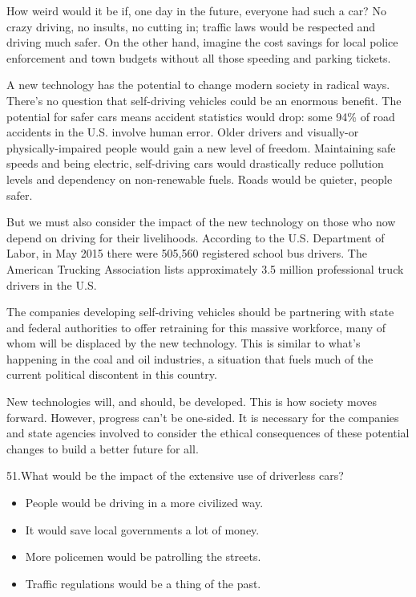 \documentclass[UTF8,11pt]{ctexart}
\begin{document}
How weird would it be if, one day in the future, everyone had such a car? No crazy driving, no insults, no cutting in; traffic laws would be respected and driving much safer. On the other hand, imagine the cost savings for local police enforcement and town budgets without all those speeding and parking tickets.


A new technology has the potential to change modern society in radical ways. There’s no question that self-driving vehicles could be an enormous benefit. The potential for safer cars means accident statistics would drop: some 94\% of road accidents in the U.S. involve human error. Older drivers and visually-or physically-impaired people would gain a new level of freedom. Maintaining safe speeds and being electric, self-driving cars would drastically reduce pollution levels and dependency on non-renewable fuels. Roads would be quieter, people safer.


But we must also consider the impact of the new technology on those who now depend on driving for their livelihoods. According to the U.S. Department of Labor, in May 2015 there were 505,560 registered school bus drivers. The American Trucking Association lists approximately 3.5 million professional truck drivers in the U.S.


The companies developing self-driving vehicles should be partnering with state and federal authorities to offer retraining for this massive workforce, many of whom will be displaced by the new technology. This is similar to what’s happening in the coal and oil industries, a situation that fuels much of the current political discontent in this country.


New technologies will, and should, be developed. This is how society moves forward. However, progress can’t be one-sided. It is necessary for the companies and state agencies involved to consider the ethical consequences of these potential changes to build a better future for all.


51.What would be the impact of the extensive use of driverless cars?


\begin{itemize}[leftmargin=2em,itemsep=.2em,topsep=.4em]\item[A.] People would be driving in a more civilized way.
\item[B.] It would save local governments a lot of money.
\item[C.] More policemen would be patrolling the streets.
\item[D.] Traffic regulations would be a thing of the past.
\end{itemize}
\end{document}
